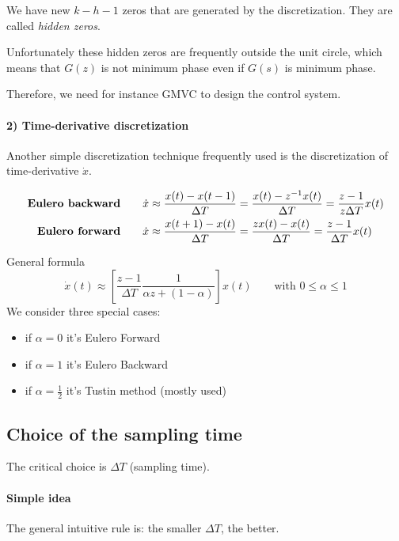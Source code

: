 \begin{appendices}
\begin{recall}[$s$-domain]
    We have new $k-h-1$ zeros that are generated by the discretization.
    They are called \emph{hidden zeros}.

    Unfortunately these hidden zeros are frequently outside the unit circle, which means that $G(z)$ is not minimum phase even if $G(s)$ is minimum phase.

    Therefore, we need for instance GMVC to design the control system.
\end{recall}

\paragraph{2) Time-derivative discretization}

Another simple discretization technique frequently used is the discretization of time-derivative $\dot{x}$.

\begin{align*}
    \text{\textbf{Eulero backward}} &\qquad \dot{x} \approx \frac{x(t)-x(t-1)}{\Delta T} = \frac{x(t)-z^{-1}x(t)}{\Delta T} = \frac{z-1}{z\Delta T} x(t) \\
    \text{\textbf{Eulero forward}} &\qquad \dot{x} \approx \frac{x(t+1)-x(t)}{\Delta T} = \frac{zx(t)-x(t)}{\Delta T} = \frac{z-1}{\Delta T} x(t)
\end{align*}

General formula
\[
    \dot{x}(t) \approx \left[ \frac{z-1}{\Delta T} \frac{1}{\alpha z + (1-\alpha)} \right]x(t) \qquad \text{with } 0 \le \alpha \le 1
\]
We consider three special cases:
\begin{itemize}
    \item if $\alpha = 0$ it's Eulero Forward
    \item if $\alpha = 1$ it's Eulero Backward
    \item if $\alpha = \frac{1}{2}$ it's Tustin method (mostly used)
\end{itemize}

\subsection*{Choice of the sampling time}

The critical choice is $\Delta T$ (sampling time).

\paragraph{Simple idea}
The general intuitive rule is: the smaller $\Delta T$, the better.


\end{appendices}

